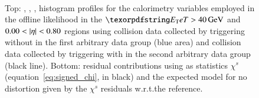 \begin{figure}[b]
\begin{center}
\begin{subfigure}[c]{.48\textwidth}
\end{subfigure} \\
\caption{%
	Top: \reta, \eratio, \rphi, \rhad histogram profiles for the calorimetry variables employed in the offline likelihood in the $\et>\SI{40}{\GeV}$ and $0.00<\abseta{}<0.80$ regions using collision data collected by
	triggering without \rnn{} in the first arbitrary data group
	(blue area) and collision data collected by triggering with \rnn{} in the second
	arbitrary data group (black line).  Bottom: residual contributions using as
	statistics $\chi^s$ (equation~\ref{eq:signed_chi}, in black) and the expected
	model for no distortion given by the $\chi^s$ residuals w.r.t.\@ the
	reference.
}%
\label{fig:groups_homogeneity_calo}
\end{center}
\end{figure}%


\FloatBarrier

